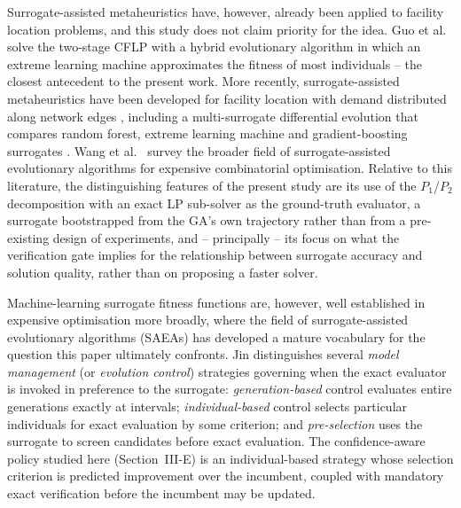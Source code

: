 \documentclass[conference]{IEEEtran}
\begin{document}
Surrogate-assisted metaheuristics have, however, already been applied to
facility location problems, and this study does not claim priority for the
idea. Guo et al.\ \citep{guo2017} solve the two-stage CFLP with a hybrid
evolutionary algorithm in which an extreme learning machine approximates the
fitness of most individuals -- the closest antecedent to the present work.
More recently, surrogate-assisted metaheuristics have been developed for
facility location with demand distributed along network edges
\citep{turkes2024}, including a multi-surrogate differential evolution that
compares random forest, extreme learning machine and gradient-boosting
surrogates \citep{multisurrogate2024}. Wang et al.\ \citep{ecopsurvey2024}
survey the broader field of surrogate-assisted evolutionary algorithms for
expensive combinatorial optimisation. Relative to this literature, the
distinguishing features of the present study are its use of the $P_1$/$P_2$
decomposition with an exact LP sub-solver as the ground-truth evaluator, a
surrogate bootstrapped from the GA's own trajectory rather than from a
pre-existing design of experiments, and -- principally -- its focus on what the
verification gate implies for the relationship between surrogate accuracy and
solution quality, rather than on proposing a faster solver.

Machine-learning surrogate fitness functions are, however, well established in
expensive optimisation more broadly, where the field of surrogate-assisted
evolutionary algorithms (SAEAs) has developed a mature vocabulary for the
question this paper ultimately confronts. Jin \citep{jin2011} distinguishes
several \emph{model management} (or \emph{evolution control}) strategies
governing when the exact evaluator is invoked in preference to the surrogate:
\emph{generation-based} control evaluates entire generations exactly at
intervals; \emph{individual-based} control selects particular individuals for
exact evaluation by some criterion; and \emph{pre-selection} uses the surrogate
to screen candidates before exact evaluation. The confidence-aware policy
studied here (Section~III-E) is an individual-based strategy whose selection
criterion is predicted improvement over the incumbent, coupled with mandatory
exact verification before the incumbent may be updated.
\end{document}
